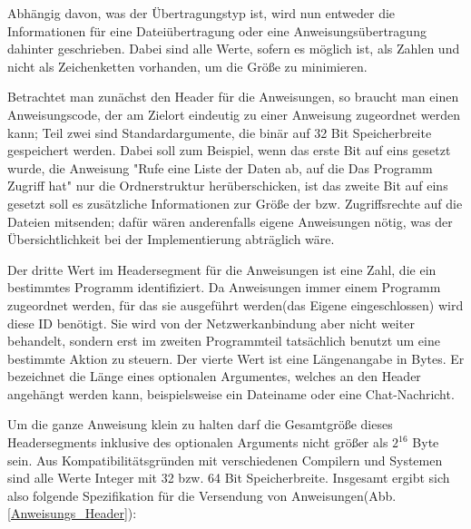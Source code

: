 Abhängig davon, was der Übertragungstyp ist, wird nun entweder die Informationen für eine Dateiübertragung oder eine Anweisungsübertragung dahinter geschrieben.
Dabei sind alle Werte, sofern es möglich ist, als Zahlen und nicht als Zeichenketten vorhanden, um die Größe zu minimieren.\par 
Betrachtet man zunächst den Header für die Anweisungen, so braucht man einen Anweisungscode, der am Zielort eindeutig zu einer Anweisung zugeordnet werden kann; Teil zwei sind Standardargumente, die binär auf 32 Bit Speicherbreite gespeichert werden.
Dabei soll zum Beispiel, wenn das erste Bit auf eins gesetzt wurde, die Anweisung "Rufe eine Liste der Daten ab, auf die Das Programm Zugriff hat" nur die Ordnerstruktur herüberschicken, ist das zweite Bit auf eins gesetzt soll es zusätzliche Informationen zur Größe der bzw. Zugriffsrechte auf die Dateien mitsenden; dafür wären anderenfalls eigene Anweisungen nötig, was der Übersichtlichkeit bei der Implementierung abträglich wäre.\par 
Der dritte Wert im Headersegment für die Anweisungen ist eine Zahl, die ein bestimmtes Programm identifiziert.
Da Anweisungen immer einem Programm zugeordnet werden, für das sie ausgeführt werden(das Eigene eingeschlossen) wird diese ID benötigt.
Sie wird von der Netzwerkanbindung aber nicht weiter behandelt, sondern erst im zweiten Programmteil tatsächlich benutzt um eine bestimmte Aktion zu steuern.
Der vierte Wert ist eine Längenangabe in Bytes.
Er bezeichnet die Länge eines optionalen Argumentes, welches an den Header angehängt werden kann, beispielsweise ein Dateiname oder eine Chat-Nachricht.\par 
Um die ganze Anweisung klein zu halten darf die Gesamtgröße dieses Headersegments inklusive des optionalen Arguments nicht größer als $2^{16}$ Byte sein.
Aus Kompatibilitätsgründen mit verschiedenen Compilern und Systemen sind alle Werte Integer mit 32 bzw. 64 Bit Speicherbreite.
Insgesamt ergibt sich also folgende Spezifikation für die Versendung von Anweisungen(Abb. \ref{Anweisungs_Header}):\par


